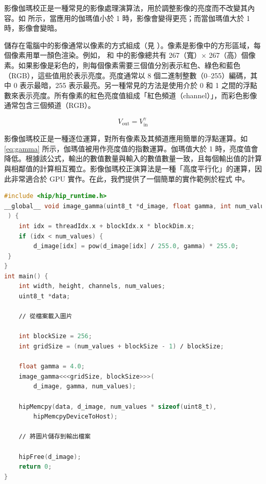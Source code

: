 影像伽瑪校正是一種常見的影像處理演算法，用於調整影像的亮度而不改變其內容。如  所示，當應用的伽瑪值小於 1 時，影像會變得更亮；而當伽瑪值大於 1 時，影像會變暗。

儲存在電腦中的影像通常以像素的方式組成（見 ）。像素是影像中的方形區域，每個像素用單一顏色渲染。例如， 和   中的影像總共有 267（寬）× 267（高）個像素。如果影像是彩色的，則每個像素需要三個值分別表示紅色、綠色和藍色（RGB），這些值用於表示亮度。亮度通常以 8 個二進制整數（0–255）編碼，其中 0 表示最暗，255 表示最亮。另一種常見的方法是使用介於 0 和 1 之間的浮點數來表示亮度。所有像素的紅色亮度值組成「紅色頻道（channel）」，而彩色影像通常包含三個頻道（RGB）。

\begin{equation}
    V_{\text{out}} = V_{\text{in}}^{\gamma} \tag{8.1}
    \label{eq:gamma}
\end{equation}

影像伽瑪校正是一種逐位運算，對所有像素及其頻道應用簡單的浮點運算。如 \ref{eq:gamma} 所示，伽瑪值被用作亮度值的指數運算。伽瑪值大於 1 時，亮度值會降低。根據該公式，輸出的數值數量與輸入的數值數量一致，且每個輸出值的計算與相鄰值的計算相互獨立。影像伽瑪校正演算法是一種「高度平行化」的運算，因此非常適合於 GPU 實作。在此，我們提供了一個簡單的實作範例於程式  中。

\begin{lstlisting}[language=C, caption={影像伽瑪校正應用作為一種「高度平行化」的演算法。每個執行緒(thread)負責處理影像像素陣列中的一個數值。Grid size 則反映了像素數量。}, captionpos=t, label={lst:gamma}]
#include <hip∕hip_runtime.h>
__global__ void image_gamma(uint8_t *d_image, float gamma, int num_values
 ) {
    int idx = threadIdx.x + blockIdx.x * blockDim.x;
    if (idx < num_values) {
        d_image[idx] = pow(d_image[idx] ∕ 255.0, gamma) * 255.0;
 }
}
int main() {
    int width, height, channels, num_values;
    uint8_t *data;

    ∕∕ 從檔案載入圖片

    int blockSize = 256;
    int gridSize = (num_values + blockSize - 1) ∕ blockSize;

    float gamma = 4.0;
    image_gamma<<<gridSize, blockSize>>>(
        d_image, gamma, num_values);

    hipMemcpy(data, d_image, num_values * sizeof(uint8_t),
        hipMemcpyDeviceToHost);

    ∕∕ 將圖片儲存到輸出檔案

    hipFree(d_image);
    return 0;
}
\end{lstlisting}

